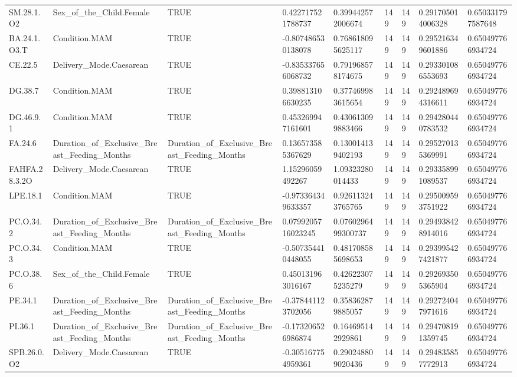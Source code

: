 \begin{longtable}{lllllllll}
SM.28.1.O2 & Sex\_of\_the\_Child.Female & TRUE & 0.422717521788737 & 0.399442572006674 & 149 & 149 & 0.291705014006328 & 0.650331797587648 \\
BA.24.1.O3.T & Condition.MAM & TRUE & -0.807486530138078 & 0.768618095625117 & 149 & 149 & 0.295216349601886 & 0.650497766934724 \\
CE.22.5 & Delivery\_Mode.Caesarean & TRUE & -0.835337656068732 & 0.791968578174675 & 149 & 149 & 0.293301086553693 & 0.650497766934724 \\
DG.38.7 & Condition.MAM & TRUE & 0.398813106630235 & 0.377469983615654 & 149 & 149 & 0.292489694316611 & 0.650497766934724 \\
DG.46.9.1 & Condition.MAM & TRUE & 0.453269947161601 & 0.430613099883466 & 149 & 149 & 0.294280440783532 & 0.650497766934724 \\
FA.24.6 & Duration\_of\_Exclusive\_Breast\_Feeding\_Months & Duration\_of\_Exclusive\_Breast\_Feeding\_Months & 0.136573585367629 & 0.130014139402193 & 149 & 149 & 0.295270135369991 & 0.650497766934724 \\
FAHFA.28.3.2O & Delivery\_Mode.Caesarean & TRUE & 1.15296059492267 & 1.09323280014433 & 149 & 149 & 0.293358991089537 & 0.650497766934724 \\
LPE.18.1 & Condition.MAM & TRUE & -0.973364349633357 & 0.926113243765765 & 149 & 149 & 0.295009593751922 & 0.650497766934724 \\
PC.O.34.2 & Duration\_of\_Exclusive\_Breast\_Feeding\_Months & Duration\_of\_Exclusive\_Breast\_Feeding\_Months & 0.0799205716023245 & 0.0760296499300737 & 149 & 149 & 0.294938428914016 & 0.650497766934724 \\
PC.O.34.3 & Condition.MAM & TRUE & -0.507354410448055 & 0.481708585698653 & 149 & 149 & 0.293995427421877 & 0.650497766934724 \\
PC.O.38.6 & Sex\_of\_the\_Child.Female & TRUE & 0.450131963016167 & 0.426223075235279 & 149 & 149 & 0.292693505365904 & 0.650497766934724 \\
PE.34.1 & Duration\_of\_Exclusive\_Breast\_Feeding\_Months & Duration\_of\_Exclusive\_Breast\_Feeding\_Months & -0.378441123702056 & 0.358362879885057 & 149 & 149 & 0.292724047971616 & 0.650497766934724 \\
PI.36.1 & Duration\_of\_Exclusive\_Breast\_Feeding\_Months & Duration\_of\_Exclusive\_Breast\_Feeding\_Months & -0.173206526986874 & 0.164695142929861 & 149 & 149 & 0.294708191359745 & 0.650497766934724 \\
SPB.26.0.O2 & Delivery\_Mode.Caesarean & TRUE & -0.305167754959361 & 0.290248809020436 & 149 & 149 & 0.294835857772913 & 0.650497766934724 \\

\end{longtable}

